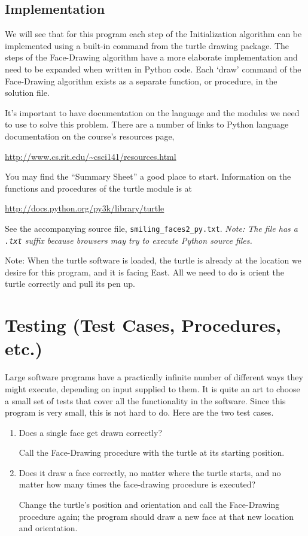 \documentclass[pdftex,12pt]{artikel3}
\begin{document}
\subsection{Implementation}
We will see that for this program
each step of the Initialization algorithm
can be implemented using a built-in command from the turtle drawing package.
The steps of the Face-Drawing algorithm have a 
more elaborate implementation and need to be expanded when
written in Python code.
Each `draw' command of the Face-Drawing algorithm 
exists as a separate function, or procedure, in the solution file.

It's important to have documentation on 
the language and the modules we need to use to solve this problem.
There are a number of links to Python language documentation on the 
course's resources page,
\begin{tt}
	\url{http://www.cs.rit.edu/~csci141/resources.html}
\end{tt}
You may find the ``Summary Sheet'' a good place to start.
Information on the functions and procedures of the turtle module is at
\begin{tt}
	\url{http://docs.python.org/py3k/library/turtle}
\end{tt}

See the accompanying source file, {\tt smiling\_faces2\_py.txt}.
\emph{Note: The file has a {\tt .txt} suffix because
browsers may try to execute Python source files.}

Note: 
When the turtle software is loaded, the turtle is already at the location 
we desire for this program, and it is facing East. 
All we need to do is orient the turtle correctly and pull its pen up.

\section{Testing (Test Cases, Procedures, etc.)}

Large software programs have a practically infinite number of different ways they might execute, depending on input supplied to them. It is quite an art to choose a small set of tests that cover all the functionality in the software. 
Since this program is very small, this is not hard to do.
Here are the two test cases.

\begin{enumerate}
\item
Does a single face get drawn correctly?

Call the Face-Drawing procedure with the turtle 
at its starting position.

\item
Does it draw a face correctly, no matter where the turtle starts, 
and no matter how many times the face-drawing procedure is executed?

Change the turtle's position and orientation and 
call the Face-Drawing procedure again; the program should
draw a new face at that new location and orientation.
\end{enumerate}
\end{document}

